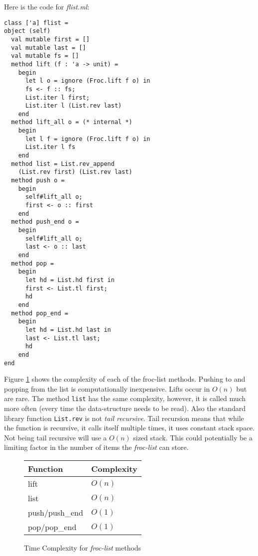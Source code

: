 Here is the code for \emph{flist.ml}:

\begin{lstlisting}[caption={flist.ml}]
class ['a] flist =
object (self)
  val mutable first = []
  val mutable last = []
  val mutable fs = []
  method lift (f : 'a -> unit) = 
    begin
      let l o = ignore (Froc.lift f o) in
      fs <- f :: fs;
      List.iter l first;
      List.iter l (List.rev last)
    end
  method lift_all o = (* internal *)
    begin
      let l f = ignore (Froc.lift f o) in
      List.iter l fs
    end
  method list = List.rev_append
    (List.rev first) (List.rev last)
  method push o =
    begin
      self#lift_all o;
      first <- o :: first
    end
  method push_end o =
    begin
      self#lift_all o;
      last <- o :: last
    end
  method pop =
    begin
      let hd = List.hd first in
      first <- List.tl first;
      hd
    end
  method pop_end =
    begin
      let hd = List.hd last in
      last <- List.tl last;
      hd
    end
end
\end{lstlisting}

Figure \ref{fig:flist-comp} shows the complexity of each of the froc-list methods. Pushing to and popping from the list is computationally inexpensive. Lifts occur in $O(n)$ but are rare. The method \texttt{list} has the same complexity, however, it is called much more often (every time the data-structure needs to be read). Also the standard library function \texttt{List.rev} is not \emph{tail recursive}. Tail recursion means that while the function is recursive, it calls itself multiple times, it uses constant stack space. Not being tail recursive will use a $O(n)$ sized stack. This could potentially be a limiting factor in the number of items the \emph{froc-list} can store.

\begin{figure}
  \centering
  \begin{tabular}{|l|l|}
    \hline
    \textbf{Function} & \textbf{Complexity} \\
    \hline
      lift & $O(n)$ \\
      \hline
      list & $O(n)$\\
      \hline
      push/push\_end & $O(1)$ \\
      \hline
      pop/pop\_end & $O(1)$ \\
      \hline
  \end{tabular}
  \caption{Time Complexity for \emph{froc-list} methods}
  \label{fig:flist-comp}
\end{figure}

